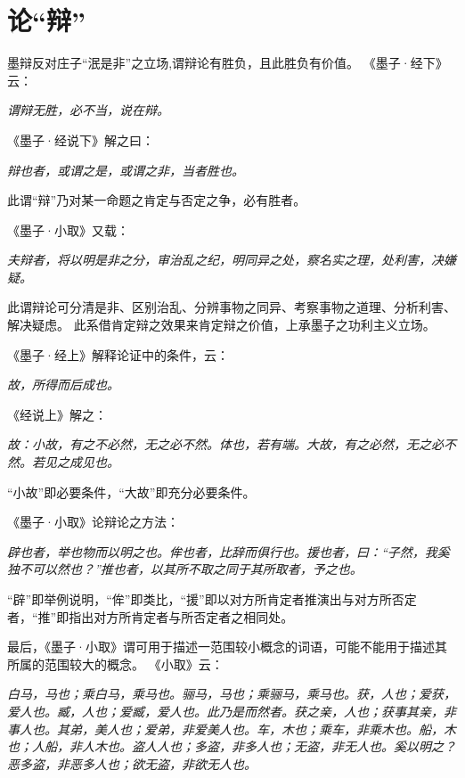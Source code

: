 \documentclass[11pt]{article}
\begin{document}
\section{论“辩”}
墨辩反对庄子“泯是非”之立场,谓辩论有胜负，且此胜负有价值。
《墨子·经下》云：

\textit{谓辩无胜，必不当，说在辩。}

《墨子·经说下》解之曰：

\textit{辩也者，或谓之是，或谓之非，当者胜也。}

此谓“辩”乃对某一命题之肯定与否定之争，必有胜者。

\newline
《墨子·小取》又载：

\textit{夫辩者，将以明是非之分，审治乱之纪，明同异之处，察名实之理，处利害，决嫌疑。}

此谓辩论可分清是非、区别治乱、分辨事物之同异、考察事物之道理、分析利害、解决疑虑。
此系借肯定辩之效果来肯定辩之价值，上承墨子之功利主义立场。

\newline

《墨子·经上》解释论证中的条件，云：

\textit{故，所得而后成也。}

《经说上》解之：

\textit{故：小故，有之不必然，无之必不然。体也，若有端。大故，有之必然，无之必不然。若见之成见也。}

“小故”即必要条件，“大故”即充分必要条件。

\newline

《墨子·小取》论辩论之方法：

\textit{辟也者，举也物而以明之也。侔也者，比辞而俱行也。援也者，曰：“子然，我奚独不可以然也？”推也者，以其所不取之同于其所取者，予之也。}

“辟”即举例说明，“侔”即类比，“援”即以对方所肯定者推演出与对方所否定者，“推”即指出对方所肯定者与所否定者之相同处。

\newline

最后，《墨子·小取》谓可用于描述一范围较小概念的词语，可能不能用于描述其所属的范围较大的概念。
《小取》云：

\textit{白马，马也；乘白马，乘马也。骊马，马也；乘骊马，乘马也。获，人也；爱获，爱人也。臧，人也；爱臧，爱人也。此乃是而然者。获之亲，人也；获事其亲，非事人也。其弟，美人也；爱弟，非爱美人也。车，木也；乘车，非乘木也。船，木也；人船，非人木也。盗人人也；多盗，非多人也；无盗，非无人也。奚以明之？恶多盗，非恶多人也；欲无盗，非欲无人也。}
\end{document}
